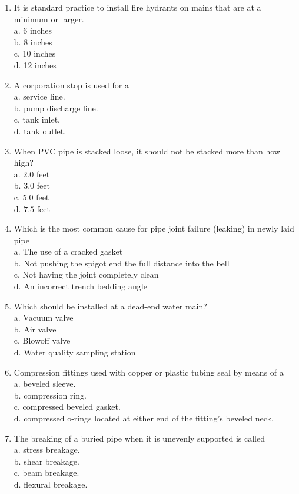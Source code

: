 \documentclass[10pt]{article}
\begin{document}
\begin{enumerate}
  \item It is standard practice to install fire hydrants on mains that are at a minimum or larger.\\
a. 6 inches\\
b. 8 inches\\
c. 10 inches\\
d. 12 inches

  \item A corporation stop is used for a\\
a. service line.\\
b. pump discharge line.\\
c. tank inlet.\\
d. tank outlet.

  \item When PVC pipe is stacked loose, it should not be stacked more than how high?\\
a. $2.0$ feet\\
b. $3.0$ feet\\
c. $5.0$ feet\\
d. $7.5$ feet

  \item Which is the most common cause for pipe joint failure (leaking) in newly laid pipe\\
a. The use of a cracked gasket\\
b. Not pushing the spigot end the full distance into the bell\\
c. Not having the joint completely clean\\
d. An incorrect trench bedding angle

  \item Which should be installed at a dead-end water main?\\
a. Vacuum valve\\
b. Air valve\\
c. Blowoff valve\\
d. Water quality sampling station

  \item Compression fittings used with copper or plastic tubing seal by means of a\\
a. beveled sleeve.\\
b. compression ring.\\
c. compressed beveled gasket.\\
d. compressed o-rings located at either end of the fitting's beveled neck. 

  \item The breaking of a buried pipe when it is unevenly supported is called\\
a. stress breakage.\\
b. shear breakage.\\
c. beam breakage.\\
d. flexural breakage.


\end{enumerate}
\end{document}
